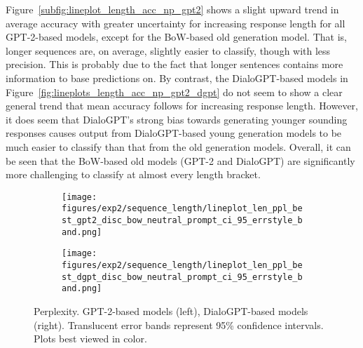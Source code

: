 
Figure~\ref{subfig:lineplot_length_acc_np_gpt2} shows a slight upward trend in average accuracy with greater uncertainty for increasing response length for all GPT-2-based models, except for the BoW-based old generation model. That is, longer sequences are, on average, slightly easier to classify, though with less precision. This is probably due to the fact that longer sentences contains more information to base predictions on. 
By contrast, the DialoGPT-based models in Figure~\ref{fig:lineplots_length_acc_np_gpt2_dgpt} do not seem to show a clear general trend that mean accuracy follows for increasing response length. However, it does seem that DialoGPT's strong bias towards generating younger sounding responses causes output from DialoGPT-based young generation models to be much easier to classify than that from the old generation models. Overall, it can be seen that the BoW-based old models (GPT-2 and DialoGPT) are significantly more challenging to classify at almost every length bracket.

\begin{figure}[H]
     \centering
     \begin{subfigure}[b]{0.49\textwidth}
        \centering
\texttt{[image: figures/exp2/sequence\_length/lineplot\_len\_ppl\_best\_gpt2\_disc\_bow\_neutral\_prompt\_ci\_95\_errstyle\_band.png]}
        \caption{}
        \label{subfig:lineplot_length_ppl_np_gpt2}
     \end{subfigure}
     \hfill
     \begin{subfigure}[b]{0.49\textwidth}
        \centering
        \texttt{[image: figures/exp2/sequence\_length/lineplot\_len\_ppl\_best\_dgpt\_disc\_bow\_neutral\_prompt\_ci\_95\_errstyle\_band.png]}
        \caption{}
        \label{subfig:lineplot_length_ppl_np_dgpt}
     \end{subfigure}
        \caption{Perplexity. GPT-2-based models (left), DialoGPT-based models (right). Translucent error bands represent 95\% confidence intervals. Plots best viewed in color.}
        \label{fig:lineplots_length_ppl_np_gpt2_dgpt}
\end{figure}

